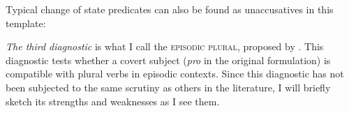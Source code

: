 \begin{exe}
\begin{xlist}
\begin{exe}
\begin{xlist}
\begin{exe}
\begin{xlist}
\begin{exe}
\begin{exe}
\begin{xlist}
\begin{exe}
\begin{xlist}
\begin{exe}
\begin{xlist}
\begin{exe}
\begin{xlist}
 \begin{exe}\judgewidth{\#}
 \ex  \label{ex:2n9}
 \begin{xlist} 
	
	
	

	
 \z
\z 

Typical change of state predicates can also be found as unaccusatives in this template:
 \begin{exe}
 \ex  
 \begin{xlist} 
	
	
 \z
\z 


\textit{The third diagnostic} is what I call the \textsc{episodic plural}, proposed by \cite{borer98csli,borer05vol2}. This diagnostic tests whether a covert subject (\emph{pro} in the original formulation) is compatible with plural verbs in episodic contexts. Since this diagnostic has not been subjected to the same scrutiny as others in the literature, I will briefly sketch its strengths and weaknesses as I see them.


\end{xlist}
\end{exe}
\end{xlist}
\end{exe}
\end{xlist}
\end{exe}
\end{xlist}
\end{exe}
\end{xlist}
\end{exe}
\end{xlist}
\end{exe}
\end{exe}
\end{xlist}
\end{exe}
\end{xlist}
\end{exe}
\end{xlist}
\end{exe}
